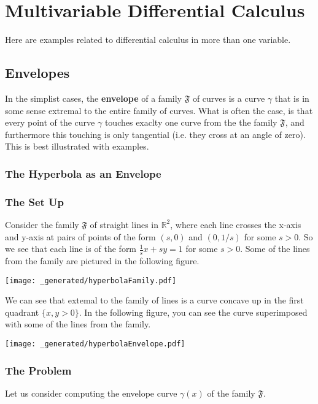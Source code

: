 \section{Multivariable Differential Calculus}

Here are examples related to differential calculus in more than one variable.

\subsection{Envelopes}

In the simplist cases, the \textbf{envelope} of a family \(\mathfrak F\) of curves is a curve \(\gamma\) that is in some sense extremal to the entire family of curves. 
What is often the case, is that every point of the curve \(\gamma\) touches exaclty one curve from the the family \(\mathfrak F\), and furthermore this touching is only tangential (i.e. they cross at an angle of zero). 
This is best illustrated with examples. 

\subsubsection{The Hyperbola as an Envelope}

\subsubsection*{The Set Up}

Consider the family \(\mathfrak F\) of straight lines in \(\mathbb R^2\), where each line crosses the x-axis and y-axis at pairs of points of the form \((s,0)\) and \((0, 1/s)\) for some \(s > 0\). 
So we see that each line is of the form \(\frac{1}{s} x + s y = 1\) for some \(s > 0\).
Some of the lines from the family are pictured in the following figure.

\texttt{[image: \_generated/hyperbolaFamily.pdf]}

We can see that extemal to the family of lines is a curve concave up in the first quadrant \(\{x, y > 0\}\). In the following figure, you can see the curve superimposed with some of the lines from the family.

\texttt{[image: \_generated/hyperbolaEnvelope.pdf]}

\subsubsection*{The Problem}
Let us consider computing the envelope curve \(\gamma(x)\) of the family \(\mathfrak F\). 

